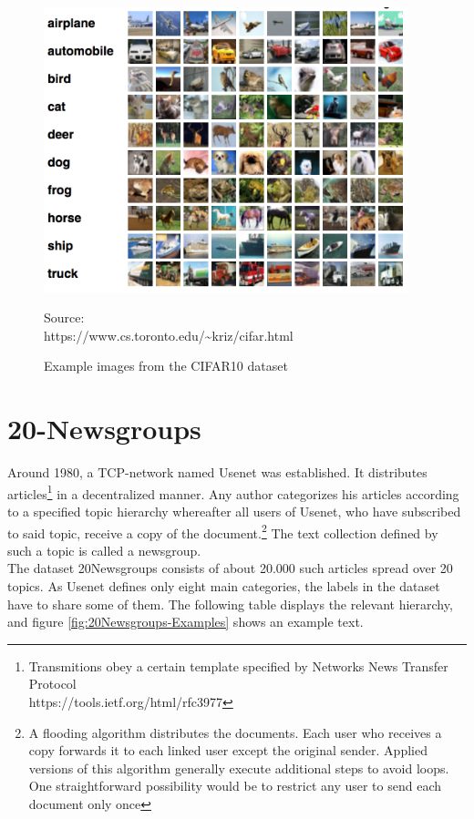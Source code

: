\begin{figure}
	\centering
	\includegraphics[width=400px]{gfx/6-Datasets/CIFAR10_examples.png}
	\caption{Example images from the CIFAR10 dataset}
	\vspace{7pt}
	\footnotesize{
		Source:\\
		https://www.cs.toronto.edu/\textasciitilde kriz/cifar.html
	}
	\label{fig:CIFAR10-Examples}
\end{figure}
\newpage

\section{20-Newsgroups}
Around 1980, a TCP-network named Usenet was established. It distributes articles\footnote{
	Transmitions obey a certain template specified by  Networks News Transfer Protocol\\
	https://tools.ietf.org/html/rfc3977
}
in a decentralized manner. Any author categorizes his articles according to a specified topic hierarchy whereafter all users of Usenet, who have subscribed to said topic, receive a copy of the document.\footnote{
	A flooding algorithm distributes the documents. Each user who receives a copy forwards it to each linked user except the original sender. Applied versions of this algorithm generally execute additional steps to avoid loops. One straightforward possibility would be to restrict any user to send each document only once
}
The text collection defined by such a topic is called a newsgroup.\cite{Usenet}\\
The dataset 20Newsgroups consists of about 20.000 such articles spread over 20 topics. As Usenet defines only eight main categories, the labels in the dataset have to share some of them. The following table displays the relevant hierarchy, and figure \ref{fig:20Newsgroups-Examples} shows an example text.\cite{20-Newsgroups}

